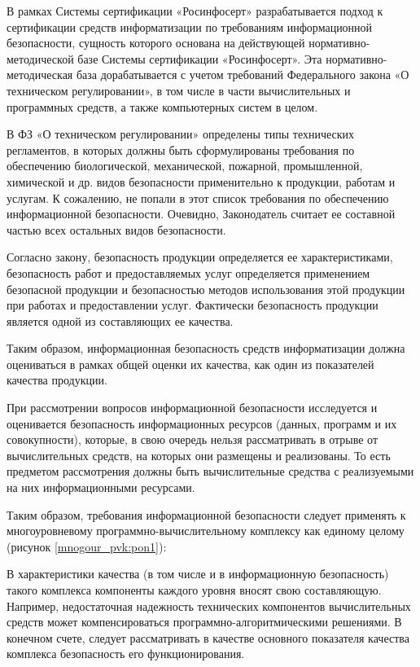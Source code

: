 В рамках Системы сертификации «Росинфосерт» разрабатывается подход к сертификации средств информатизации по требованиям информационной безопасности, сущность которого основана на действующей нормативно-методической базе Системы сертификации «Росинфосерт». Эта нормативно-методическая база дорабатывается с учетом требований Федерального закона «О техническом регулировании», в том числе в части вычислительных и программных средств, а также компьютерных систем в целом.

В ФЗ «О техническом регулировании» определены типы технических регламентов, в которых должны быть сформулированы требования по обеспечению биологической, механической, пожарной, промышленной, химической и др. видов безопасности применительно к продукции, работам и услугам. К сожалению, не попали в этот список требования по обеспечению информационной безопасности. Очевидно, Законодатель считает ее составной частью всех остальных видов безопасности.

Согласно закону, безопасность продукции определяется ее характеристиками, безопасность работ и предоставляемых услуг определяется применением безопасной продукции и безопасностью методов использования этой продукции при работах и предоставлении услуг. Фактически безопасность продукции является одной из составляющих ее качества.

Таким образом, информационная безопасность средств информатизации должна оцениваться в рамках общей оценки их качества, как один из показателей качества продукции.

При рассмотрении вопросов информационной безопасности исследуется и оценивается безопасность информационных ресурсов (данных, программ и их совокупности), которые, в свою очередь нельзя рассматривать в отрыве от вычислительных средств, на которых они размещены и реализованы. То есть предметом рассмотрения должны быть вычислительные средства с реализуемыми на них информационными ресурсами.

Таким образом, требования информационной безопасности следует применять к многоуровневому программно-вычислительному комплексу как единому целому (рисунок \ref{mnogour_pvk:pon1}):

В характеристики качества (в том числе и в информационную безопасность) такого комплекса компоненты каждого уровня вносят свою составляющую. Например, недостаточная надежность технических компонентов вычислительных средств может компенсироваться программно-алгоритмическими решениями. В конечном счете, следует рассматривать в качестве основного показателя качества комплекса безопасность его функционирования.

